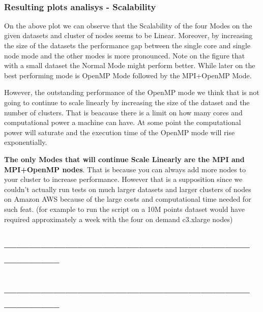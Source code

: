 \documentclass[11pt]{article}
\begin{document}
    \begin{center}
    \end{center}
    { \hspace*{\fill} \\}
    
    \hypertarget{resulting-plots-analisys---scalability}{%
\subsubsection{Resulting plots analisys -
Scalability}\label{resulting-plots-analisys---scalability}}

On the above plot we can observe that the Scalability of the four Modes
on the given datasets and cluster of nodes seems to be Linear. Moreover,
by increasing the size of the datasets the performance gap between the
single core and single node mode and the other modes is more pronounced.
Note on the figure that with a small dataset the Normal Mode might
perform better. While later on the best performing mode is OpenMP Mode
followed by the MPI+OpenMP Mode.

However, the outstanding performance of the OpenMP mode we think that is
not going to continue to scale linearly by increasing the size of the
dataset and the number of clusters. That is beacause there is a limit on
how many cores and computational power a machine can have. At some point
the computational power will saturate and the execution time of the
OpenMP mode will rise exponentially.

\textbf{The only Modes that will continue Scale Linearly are the MPI and
MPI+OpenMP nodes}. That is because you can always add more nodes to your
cluster to increase performance. However that is a supposition since we
couldn't actually run tests on much larger datasets and larger clusters
of nodes on Amazon AWS because of the large costs and computational time
needed for such feat. (for example to run the script on a 10M points
dataset would have required approximately a week with the four on demand
c3.xlarge nodes)

    \hypertarget{section}{%
\subsection{--------------------------------------------------------------------------}\label{section}}

\hypertarget{section-1}{%
\subsection{--------------------------------------------------------------------------}\label{section-1}}
\end{document}
